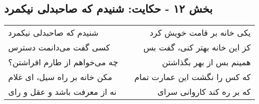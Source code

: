 \begin{center}
\section*{بخش ۱۲ - حکایت: شنیدم که صاحبدلی نیکمرد}
\label{sec:012}
\begin{longtable}{l p{0.5cm} r}
شنیدم که صاحبدلی نیکمرد
&&
یکی خانه بر قامت خویش کرد
\\
کسی گفت می‌دانمت دسترس
&&
کز این خانه بهتر کنی، گفت بس
\\
چه می‌خواهم از طارم افراشتن؟
&&
همینم بس از بهر بگذاشتن
\\
مکن خانه بر راه سیل، ای غلام
&&
که کس را نگشت این عمارت تمام
\\
نه از معرفت باشد و عقل و رای
&&
که بر ره کند کاروانی سرای
\\
\end{longtable}
\end{center}
